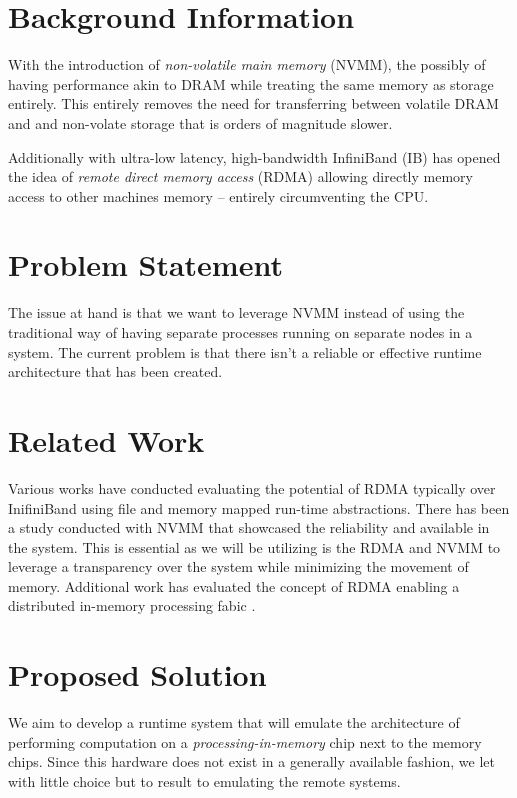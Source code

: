 \documentclass[12pt]{article}
\begin{document}
\section{Background Information}

With the introduction of \emph{non-volatile main memory} (NVMM), the possibly of having performance akin to DRAM while treating the same memory as storage entirely. This entirely removes the need for transferring between volatile DRAM and and non-volate storage that is orders of magnitude slower.

Additionally with ultra-low latency, high-bandwidth InfiniBand (IB) has opened the idea of \emph{remote direct memory access} (RDMA) allowing directly memory access to other machines memory -- entirely circumventing the CPU. 

\section{Problem Statement}

The issue at hand is that we want to leverage NVMM instead of using the traditional way of having separate processes running on separate nodes in a system. The current problem is that there isn't a reliable or effective runtime architecture that has been created. 

\section{Related Work} 
Various works have conducted evaluating the potential of RDMA typically over InifiniBand \cite{Liang2005} using file \cite{Yang2020} and memory mapped run-time abstractions. There has been a study conducted with NVMM \cite{Zhang2015} that showcased the reliability and available in the system. This is essential as we will be utilizing is the RDMA and NVMM to leverage a transparency over the system while minimizing the movement of memory. Additional work has evaluated the concept of RDMA enabling a distributed in-memory processing fabic \cite{Novakovic2014}.

\section{Proposed Solution}
We aim to develop a runtime system that will emulate the architecture of performing computation on a \emph{processing-in-memory} chip next to the memory chips. Since this hardware does not exist in a generally available fashion, we let with little choice but to result to emulating the remote systems.
\end{document}

